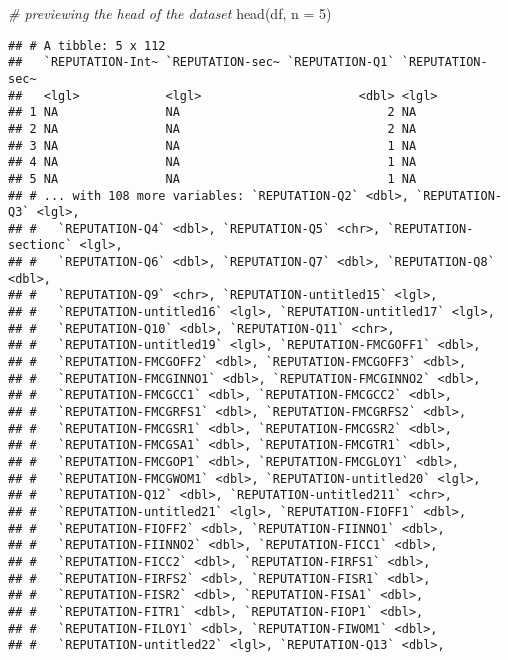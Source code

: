 \documentclass[
]{article}
\newenvironment{Shaded}{\begin{snugshade}}{\end{snugshade}}
\newcommand{\AttributeTok}[1]{\textcolor[rgb]{0.77,0.63,0.00}{#1}}
\newcommand{\CommentTok}[1]{\textcolor[rgb]{0.56,0.35,0.01}{\textit{#1}}}
\newcommand{\DecValTok}[1]{\textcolor[rgb]{0.00,0.00,0.81}{#1}}
\newcommand{\FunctionTok}[1]{\textcolor[rgb]{0.00,0.00,0.00}{#1}}
\newcommand{\NormalTok}[1]{#1}
\begin{document}
\begin{Shaded}
\begin{Highlighting}[]
\CommentTok{\# previewing the head of the dataset}
\FunctionTok{head}\NormalTok{(df, }\AttributeTok{n =} \DecValTok{5}\NormalTok{)}
\end{Highlighting}
\end{Shaded}

\begin{verbatim}
## # A tibble: 5 x 112
##   `REPUTATION-Int~ `REPUTATION-sec~ `REPUTATION-Q1` `REPUTATION-sec~
##   <lgl>            <lgl>                      <dbl> <lgl>           
## 1 NA               NA                             2 NA              
## 2 NA               NA                             2 NA              
## 3 NA               NA                             1 NA              
## 4 NA               NA                             1 NA              
## 5 NA               NA                             1 NA              
## # ... with 108 more variables: `REPUTATION-Q2` <dbl>, `REPUTATION-Q3` <lgl>,
## #   `REPUTATION-Q4` <dbl>, `REPUTATION-Q5` <chr>, `REPUTATION-sectionc` <lgl>,
## #   `REPUTATION-Q6` <dbl>, `REPUTATION-Q7` <dbl>, `REPUTATION-Q8` <dbl>,
## #   `REPUTATION-Q9` <chr>, `REPUTATION-untitled15` <lgl>,
## #   `REPUTATION-untitled16` <lgl>, `REPUTATION-untitled17` <lgl>,
## #   `REPUTATION-Q10` <dbl>, `REPUTATION-Q11` <chr>,
## #   `REPUTATION-untitled19` <lgl>, `REPUTATION-FMCGOFF1` <dbl>,
## #   `REPUTATION-FMCGOFF2` <dbl>, `REPUTATION-FMCGOFF3` <dbl>,
## #   `REPUTATION-FMCGINNO1` <dbl>, `REPUTATION-FMCGINNO2` <dbl>,
## #   `REPUTATION-FMCGCC1` <dbl>, `REPUTATION-FMCGCC2` <dbl>,
## #   `REPUTATION-FMCGRFS1` <dbl>, `REPUTATION-FMCGRFS2` <dbl>,
## #   `REPUTATION-FMCGSR1` <dbl>, `REPUTATION-FMCGSR2` <dbl>,
## #   `REPUTATION-FMCGSA1` <dbl>, `REPUTATION-FMCGTR1` <dbl>,
## #   `REPUTATION-FMCGOP1` <dbl>, `REPUTATION-FMCGLOY1` <dbl>,
## #   `REPUTATION-FMCGWOM1` <dbl>, `REPUTATION-untitled20` <lgl>,
## #   `REPUTATION-Q12` <dbl>, `REPUTATION-untitled211` <chr>,
## #   `REPUTATION-untitled21` <lgl>, `REPUTATION-FIOFF1` <dbl>,
## #   `REPUTATION-FIOFF2` <dbl>, `REPUTATION-FIINNO1` <dbl>,
## #   `REPUTATION-FIINNO2` <dbl>, `REPUTATION-FICC1` <dbl>,
## #   `REPUTATION-FICC2` <dbl>, `REPUTATION-FIRFS1` <dbl>,
## #   `REPUTATION-FIRFS2` <dbl>, `REPUTATION-FISR1` <dbl>,
## #   `REPUTATION-FISR2` <dbl>, `REPUTATION-FISA1` <dbl>,
## #   `REPUTATION-FITR1` <dbl>, `REPUTATION-FIOP1` <dbl>,
## #   `REPUTATION-FILOY1` <dbl>, `REPUTATION-FIWOM1` <dbl>,
## #   `REPUTATION-untitled22` <lgl>, `REPUTATION-Q13` <dbl>,

\end{verbatim}
\end{document}
